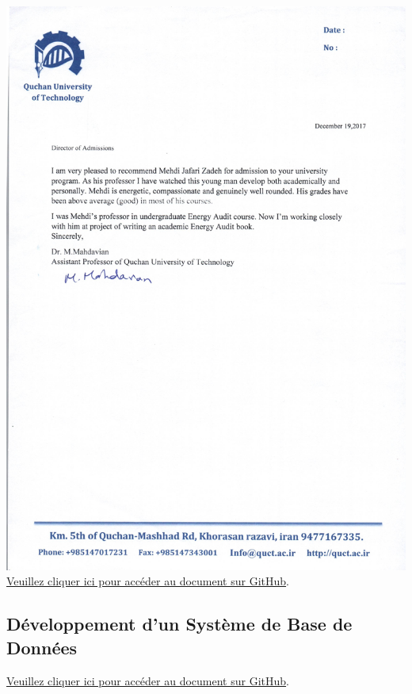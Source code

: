 \documentclass{article}
\begin{document}
        \begin{center}
            \includegraphics[width=\textwidth,height=\textheight,keepaspectratio]{../Document/Projets/Co-author/19-12-2017 lettre de recommandation - Dr. Mahdavian.jpg}
            \footnotesize
             \href{https://github.com/jafarizadeh/CV---lettre/tree/a64fa195620766a9cf39fd42a2fd963779d13f6f/Document/Projets/Co-author}{Veuillez cliquer ici pour accéder au document sur GitHub}.
        \end{center}
    


    \subsection{Développement d'un Système de Base de Données}

    \href{https://github.com/jafarizadeh/CV---lettre/tree/a64fa195620766a9cf39fd42a2fd963779d13f6f/Document/Projets/Co-author}{Veuillez cliquer ici pour accéder au document sur GitHub}.
    
\end{document}

